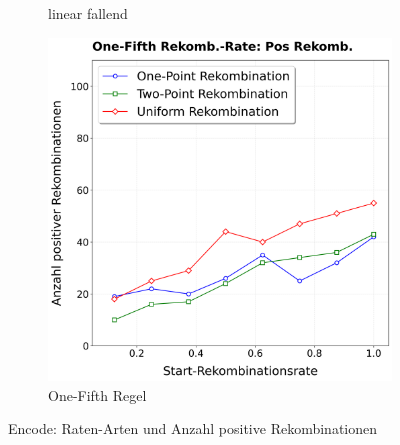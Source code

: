 \begin{figure}[H]
\begin{subfigure}[b]{0.32\textwidth}
		\caption{linear fallend}
		\label{fig:encodePosRekombinationClegg}
	\end{subfigure}%
	\hfill
	\begin{subfigure}[b]{0.32\textwidth}
		\includegraphics[width=\textwidth]{Bilder/EncodePlotPositiveRekombinationOneFifth.png}
		\caption{One-Fifth Regel}
		\label{fig:encodePosRekombinationOneFifth}
	\end{subfigure}
	\caption{Encode: Raten-Arten und Anzahl positive Rekombinationen}
	\label{fig:encodePosRekombination}
\end{figure}

